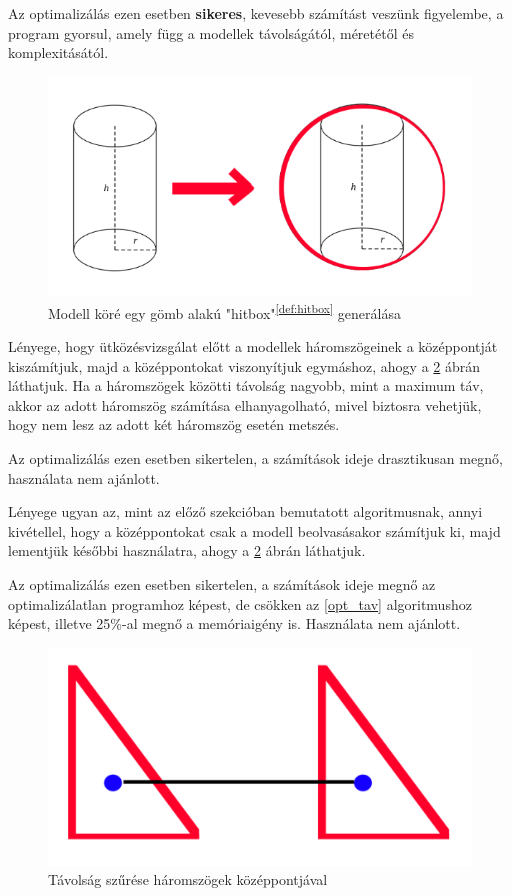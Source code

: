Az optimalizálás ezen esetben \textbf{sikeres}, kevesebb számítást veszünk figyelembe, a program gyorsul, amely függ a modellek távolságától, méretétől és komplexitásától.
\begin{figure}[h]
	\centering
	\includegraphics[width=13truecm, height=7.5truecm]{images/opt_5.1.png}
	\caption{Modell köré egy gömb alakú "hitbox"\textsuperscript{\ref{def:hitbox}} generálása}
	\label{fig:opt_1}
\end{figure}

\newpage
{}
\label{opt_tav}
Lényege, hogy ütközésvizsgálat előtt a modellek háromszögeinek a középpontját kiszámítjuk, majd a középpontokat viszonyítjuk egymáshoz, ahogy a \ref{fig:opt_2} ábrán láthatjuk. Ha a háromszögek közötti távolság nagyobb, mint a maximum táv, akkor az adott háromszög számítása elhanyagolható, mivel biztosra vehetjük, hogy nem lesz az adott két háromszög esetén metszés.

Az optimalizálás ezen esetben sikertelen, a számítások ideje drasztikusan megnő, használata nem ajánlott.

Lényege ugyan az, mint az előző szekcióban bemutatott algoritmusnak, annyi kivétellel, hogy a középpontokat csak a modell beolvasásakor számítjuk ki, majd lementjük későbbi használatra, ahogy a \ref{fig:opt_2} ábrán láthatjuk.

Az optimalizálás ezen esetben sikertelen, a számítások ideje megnő az optimalizálatlan programhoz képest, de csökken az \ref{opt_tav} algoritmushoz képest, illetve 25\%-al megnő a memóriaigény is. Használata nem ajánlott.
\begin{figure}[h]
	\centering
	\includegraphics[width=13truecm, height=7.5truecm]{images/opt_5.2.png}
	\caption{Távolság szűrése háromszögek középpontjával}
	\label{fig:opt_2}
\end{figure}

